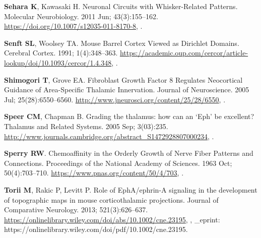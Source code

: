 \documentclass[9pt,lineno]{elife}
\begin{document}
\begin{thebibliography}{31}
\textbf{\color{eLifeMediumGrey} Sehara K}, Kawasaki H.
\newblock Neuronal {Circuits} with {Whisker}-{Related} {Patterns}.
\newblock Molecular Neurobiology.  2011 Jun; 43(3):155--162.
\newblock \urlprefix\url{https://doi.org/10.1007/s12035-011-8170-8},
  \href{10.1007/s12035-011-8170-8}{\doiprefix
  }.

\textbf{\color{eLifeMediumGrey} Senft SL}, Woolsey TA.
\newblock Mouse {Barrel} {Cortex} {Viewed} as {Dirichlet} {Domains}.
\newblock Cerebral Cortex.  1991; 1(4):348--363.
\newblock
  \urlprefix\url{https://academic.oup.com/cercor/article-lookup/doi/10.1093/cercor/1.4.348},
  \href{10.1093/cercor/1.4.348}{\doiprefix
  }.

\textbf{\color{eLifeMediumGrey} Shimogori T}, Grove EA.
\newblock Fibroblast {Growth} {Factor} 8 {Regulates} {Neocortical} {Guidance}
  of {Area}-{Specific} {Thalamic} {Innervation}.
\newblock Journal of Neuroscience.  2005 Jul; 25(28):6550--6560.
\newblock \urlprefix\url{http://www.jneurosci.org/content/25/28/6550},
  \href{10.1523/JNEUROSCI.0453-05.2005}{\doiprefix
  }.

\textbf{\color{eLifeMediumGrey} Speer CM}, Chapman B.
\newblock Grading the thalamus: how can an `{Eph}' be excellent?
\newblock Thalamus and Related Systems.  2005 Sep; 3(03):235.
\newblock
  \urlprefix\url{http://www.journals.cambridge.org/abstract_S1472928807000234},
  \href{10.1017/S1472928807000234}{\doiprefix
  }.

\textbf{\color{eLifeMediumGrey} Sperry RW}.
\newblock Chemoaffinity in the {Orderly} {Growth} of {Nerve} {Fiber} {Patterns}
  and {Connections}.
\newblock Proceedings of the National Academy of Sciences.  1963 Oct;
  50(4):703--710.
\newblock \urlprefix\url{https://www.pnas.org/content/50/4/703},
  \href{10.1073/pnas.50.4.703}{\doiprefix {}}.

\textbf{\color{eLifeMediumGrey} Torii M}, Rakic P, Levitt P.
\newblock Role of {EphA}/ephrin-{A} signaling in the development of topographic
  maps in mouse corticothalamic projections.
\newblock Journal of Comparative Neurology.  2013; 521(3):626--637.
\newblock
  \urlprefix\url{https://onlinelibrary.wiley.com/doi/abs/10.1002/cne.23195},
  \href{10.1002/cne.23195}{\doiprefix {}},
  \_eprint: https://onlinelibrary.wiley.com/doi/pdf/10.1002/cne.23195.


\end{thebibliography}
\end{document}

